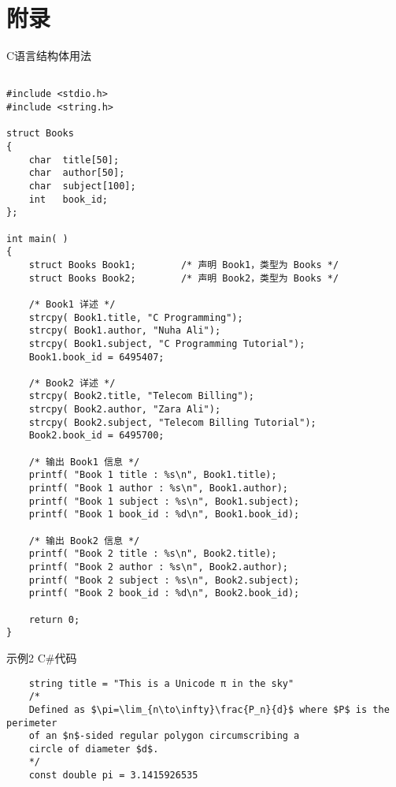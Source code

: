 \chapter{附录}
\mylineskip
{\noindent C语言结构体用法}
\renewcommand{\theFancyVerbLine}{\sffamily\textcolor[rgb]{0.6,0.2,0.3}{\normalsize\oldstylenums{\arabic{FancyVerbLine}}}}
\begin{verbatim}

#include <stdio.h>
#include <string.h>

struct Books
{
    char  title[50];
    char  author[50];
    char  subject[100];
    int   book_id;
};

int main( )
{
    struct Books Book1;        /* 声明 Book1，类型为 Books */
    struct Books Book2;        /* 声明 Book2，类型为 Books */
    
    /* Book1 详述 */
    strcpy( Book1.title, "C Programming");
    strcpy( Book1.author, "Nuha Ali"); 
    strcpy( Book1.subject, "C Programming Tutorial");
    Book1.book_id = 6495407;
    
    /* Book2 详述 */
    strcpy( Book2.title, "Telecom Billing");
    strcpy( Book2.author, "Zara Ali");
    strcpy( Book2.subject, "Telecom Billing Tutorial");
    Book2.book_id = 6495700;
    
    /* 输出 Book1 信息 */
    printf( "Book 1 title : %s\n", Book1.title);
    printf( "Book 1 author : %s\n", Book1.author);
    printf( "Book 1 subject : %s\n", Book1.subject);
    printf( "Book 1 book_id : %d\n", Book1.book_id);
    
    /* 输出 Book2 信息 */
    printf( "Book 2 title : %s\n", Book2.title);
    printf( "Book 2 author : %s\n", Book2.author);
    printf( "Book 2 subject : %s\n", Book2.subject);
    printf( "Book 2 book_id : %d\n", Book2.book_id);
    
    return 0;
}
\end{verbatim}

{\noindent 示例2 C\#代码}
\begin{verbatim}
    string title = "This is a Unicode π in the sky"
    /*
    Defined as $\pi=\lim_{n\to\infty}\frac{P_n}{d}$ where $P$ is the perimeter
    of an $n$-sided regular polygon circumscribing a
    circle of diameter $d$.
    */
    const double pi = 3.1415926535
\end{verbatim}


